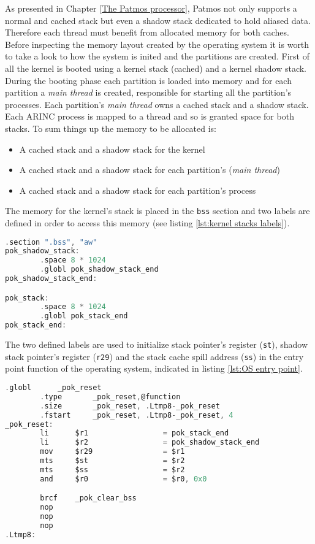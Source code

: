 As presented in Chapter \ref{The Patmos processor}, Patmos not only supports a normal and cached stack but even a shadow stack dedicated to hold aliased data. Therefore each thread must benefit from allocated memory for both caches. Before inspecting the memory layout created by the operating system it is worth to take a look to how the system is inited and the partitions are created. First of all the kernel is booted using a kernel stack (cached) and a kernel shadow stack. During the booting phase each partition is loaded into memory and for each partition a \textit{main thread} is created, responsible for starting all the partition's processes. Each partition's \textit{main thread} owns a cached stack and a shadow stack. Each ARINC process is mapped to a thread and so is granted space for both stacks. To sum things up the memory to be allocated is:

\begin{itemize}
	\item A cached stack and a shadow stack for the kernel
	\item A cached stack and a shadow stack for each partition's (\textit{main thread})
	\item A cached stack and a shadow stack for each partition's process
\end{itemize}

The memory for the kernel's stack is placed in the \texttt{bss} section and two labels are defined in order to access this memory (see listing \ref{lst:kernel stacks labels}).

\begin{lstlisting}[language=C, caption=Assembly labels for the kernel's stacks, label=lst:kernel stacks labels]
	.section ".bss", "aw"
pok_shadow_stack:
		.space 8 * 1024
		.globl pok_shadow_stack_end
pok_shadow_stack_end:

pok_stack:
		.space 8 * 1024
		.globl pok_stack_end
pok_stack_end:
\end{lstlisting}

The two defined labels are used to initialize stack pointer's register (\texttt{st}), shadow stack pointer's register (\texttt{r29}) and the stack cache spill address (\texttt{ss}) in the entry point function of the operating system, indicated in listing \ref{lst:OS entry point}.

\begin{lstlisting}[language=C, caption=Assembly code for the entry point of the operating system, label=lst:OS entry point]
		.globl 		_pok_reset
		.type 		_pok_reset,@function
		.size 		_pok_reset, .Ltmp8-_pok_reset
		.fstart		_pok_reset, .Ltmp8-_pok_reset, 4
_pok_reset:
		li		$r1 				= pok_stack_end 
		li		$r2 				= pok_shadow_stack_end
		mov 	$r29 				= $r1
		mts 	$st  				= $r2
		mts 	$ss 				= $r2
		and 	$r0 				= $r0, 0x0

		brcf 	_pok_clear_bss
		nop
		nop	
		nop
.Ltmp8:
\end{lstlisting}

